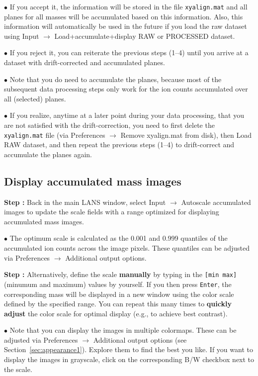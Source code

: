 \documentclass[a4paper, 11pt]{article}
\newcommand{\ttt}[1]{\texttt{#1}}
\newcommand{\lans}[1]{{\color{magenta}#1}}
\newcommand{\lanscb}[1]{{\color{darkgreen}#1}}
\newcommand{\lanstf}[1]{{\color{cyan}#1}}
\newcommand\ra{\rightarrow}
\newcounter{step}
\newcommand\s{\addtocounter{step}{1}\vskip5pt\noindent\textbf{Step \thestep:}{ }}
\newcommand\bul{\vskip5pt\noindent$\bullet${ }}
\newcommand\bb[1]{\textbf{#1}}
\begin{document}
\bul If you \lans{accept} it, the information will be stored in the file \ttt{xyalign.mat} and all planes for all masses will be accumulated based on this information. Also, this information will automatically be used in the future if you load the raw dataset using \lans{Input} $\ra$ \lans{Load+accumulate+display RAW or PROCESSED dataset}.

\bul If you \lans{reject} it, you can reiterate the previous steps (1--4) until you arrive at a dataset with drift-corrected and accumulated planes.

\bul Note that you do need to accumulate the planes, because most of the subsequent data processing steps only work for the ion counts accumulated over all (selected) planes.

\bul If you realize, anytime at a later point during your data processing, that you are not satisfied with the drift-correction, you need to first delete the \ttt{xyalign.mat} file (via \lans{Preferences} $\ra$ \lans{Remove xyalign.mat from disk}), then \lans{Load RAW dataset}, and then repeat the previous steps (1--4) to drift-correct and accumulate the planes again.


\subsection{Display accumulated mass images}
\setcounter{step}{0}

\s Back in the main LANS window, select \lans{Input} $\ra$ \lans{Autoscale accumulated images} to update the \lanstf{scale} fields with a range optimized for displaying accumulated mass images. 

\bul The optimum scale is calculated as the 0.001 and 0.999 quantiles of the accumulated ion counts across the image pixels. These quantiles can be adjusted via \lans{Preferences} $\ra$ \lans{Additional output options}.

\s Alternatively, define the \lanstf{scale} \bb{manually} by typing in the \ttt{[min max]} (minumum and maximum) values by yourself. If you then press \ttt{Enter}, the corresponding mass will be displayed in a new window using the color scale defined by the specified range. You can repeat this many times to \bb{quickly adjust} the color scale for optimal display (e.g., to achieve best contrast).

\bul Note that you can display the images in multiple colormaps. These can be adjusted via \lans{Preferences} $\ra$ \lans{Additional output options} (see Section~\ref{sec:appearance1}). Explore them to find the best you like. If you want to display the images in grayscale, click on the corresponding \lanscb{B/W} checkbox next to the scale.
\end{document}
